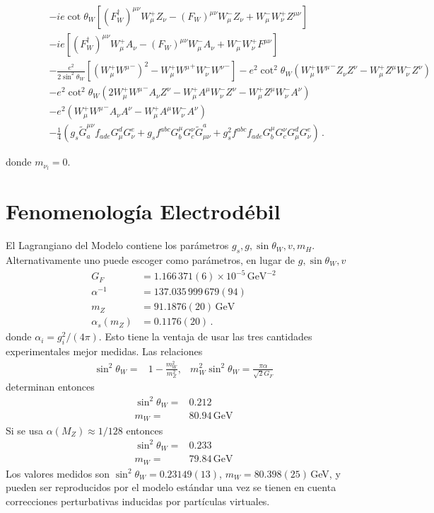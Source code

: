 \begin{frame}{}
\begin{align}
     \label{eq:234qft}
\phantom{\mathcal{L}_{\text{SM}}=}&-ie\cot\theta_W\left[(F_W^\dagger)^{\mu\nu}W_\mu^+ Z_\nu-(F_W)^{\mu\nu}W_\mu^- Z_\nu+W_\mu^-W_\nu^+Z^{\mu\nu}\right]\nonumber\\
&-ie\left[(F_W^\dagger)^{\mu\nu}W_\mu^+ A_\nu-(F_W)^{\mu\nu}W_\mu^- A_\nu+W_\mu^-W_\nu^+F^{\mu\nu}\right]\nonumber\\
&-\frac{e^2}{2\sin^2\theta_W}\left[\left(W_\mu^+{W^\mu}^-\right)^2-W_\mu^+{W^\mu}^+W_\nu^-{W^\nu}^-\right]
-e^2\cot^2\theta_W\left(W_\mu^+{W^\mu}^-Z_\nu Z^\nu-W_\mu^+Z^\mu W_\nu^-Z^\nu\right)\nonumber\\
&-e^2\cot^2\theta_W\left(2W_\mu^+{W^\mu}^-A_\nu Z^\nu-W_\mu^+A^\mu W_\nu^-Z^\nu-W_\mu^+Z^\mu W_\nu^-A^\nu\right)\nonumber\\
&-e^2\left(W_\mu^+{W^\mu}^-A_\nu A^\nu-W_\mu^+A^\mu W_\nu^-A^\nu\right)\nonumber\\
&- \frac{1}{4}\left(g_s\widetilde{G}^{\mu\nu}_af_{a d e}G^d_\mu G^e_\nu
    +g_sf^{a b c}G_b^\mu G_c^\nu\widetilde{G}_{\mu\nu}^a
    +g_s^2f^{a b c}f_{a d e}G_b^\mu G_c^\nu G^d_\mu G^e_\nu\right)\,.
\end{align}


donde $m_{\nu_l}=0$.

\end{frame}


\section{Fenomenología Electrodébil}
\label{sec:fenom-electr}
El Lagrangiano del Modelo contiene los parámetros $g_s,g,\sin\theta_W,v,m_H$. Alternativamente uno puede escoger como parámetros, en lugar de $g,\sin\theta_W,v$ \cite{a}
\begin{align}
  \label{eq:233qft}
  G_F&=1.166\,371(6)\times 10^{-5}\,\text{GeV}^{-2}\nonumber\\
  \alpha^{-1}&=137.035\,999\,679(94)\nonumber\\
  m_Z&=91.1876(20)\,\text{GeV}\nonumber\\
  \alpha_s(m_Z)&=0.1176(20)\,.
\end{align}
donde $\alpha_i=g_i^2/(4\pi)$. 
Esto tiene la ventaja de usar las tres cantidades experimentales mejor medidas. Las relaciones
\begin{align}
  \sin^2\theta_W=&1-\frac{m_W^2}{m_Z^2},&m_W^2\sin^2\theta_W=\frac{\pi\alpha}{\sqrt{2}G_F}
\end{align}
determinan entonces
\begin{align}
  \sin^2\theta_W=&0.212\nonumber\\
  m_W=&80.94\,\text{GeV}
\end{align}
Si se usa $\alpha(M_Z)\approx1/128$ entonces
\begin{align}
   \sin^2\theta_W=&0.233\nonumber\\
  m_W=&79.84\,\text{GeV}
\end{align}
Los valores medidos son $\sin^2\theta_W=0.23149(13)$, $m_W=80.398(25)\,$GeV, y pueden ser reproducidos por el modelo estándar una vez se tienen en cuenta correcciones perturbativas inducidas por partículas virtuales.

